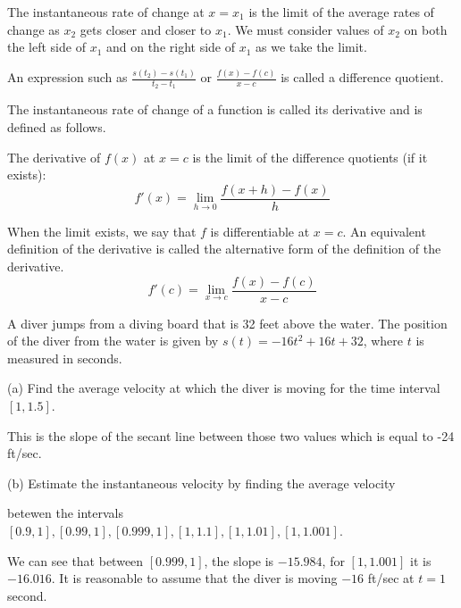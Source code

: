 \documentclass[../bccalc.tex]{subfiles}
\begin{document}
The instantaneous rate of change at $x=x_1$ is the limit of the average rates of change as $x_2$ gets closer and closer to $x_1$. We must consider values of $x_2$ on both the left side of $x_1$ and on the right side of $x_1$ as we take the limit.

An expression such as $\frac{s(t_2)-s(t_1)}{t_2-t_1}$ or $\frac{f(x)-f(c)}{x-c}$ is called a difference quotient.

The instantaneous rate of change of a function is called its derivative and is defined as follows.
\begin{definition}
    The derivative of $f(x)$ at $x=c$ is the limit of the difference quotients (if it exists):
    \[ f'(x)=\lim_{h\to 0}\frac{f(x+h)-f(x)}{h} \]
\end{definition}
When the limit exists, we say that $f$ is differentiable at $x=c$. An equivalent definition of the derivative is called the alternative form of the definition of the derivative.
\[ f'(c)=\lim_{x\to c}\frac{f(x)-f(c)}{x-c} \]

\pagebreak
\begin{example}
    A diver jumps from a diving board that is 32 feet above the water. The position of the diver from the water is given by $s(t)=-16t^2+16t+32$, where $t$ is measured in seconds. 

    (a) Find the average velocity at which the diver is moving for the time interval $[1,1.5]$.

    This is the slope of the secant line between those two values which is equal to -24 ft/sec.

    (b) Estimate the instantaneous velocity by finding the average velocity
    
    betewen the intervals $[0.9,1], [0.99,1], [0.999,1], [1,1.1], [1,1.01], [1,1.001]$.

    We can see that between $[0.999,1]$, the slope is $-15.984$, for $[1,1.001]$ it is $-16.016$. It is reasonable to assume that the diver is moving $-16$ ft/sec at $t=1$ second.
\end{example}
\end{document}
